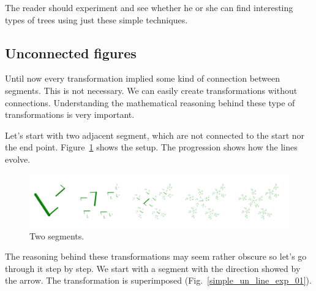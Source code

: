             \FloatBarrier

            The reader should experiment and see whether he or she can find interesting types of trees using just these simple techniques.

    \subsection{Unconnected figures}
        Until now every transformation implied some kind of connection between segments.
        This is not necessary.
        We can easily create transformations without connections.
        Understanding the mathematical reasoning behind these type of transformations is very important.
        
        Let's start with two adjacent segment, which are not connected to the start nor the end point.
        Figure~\ref{simple_un_line_01} shows the setup.
        The progression shows how the lines evolve.

        \begin{figure}[H]
            \caption{\label{simple_un_line_01} Two segments.}
            \centering
            \includegraphics[width=1.0\textwidth]{img/Simple_Techniques/Unconnect/simple_un_lines_01.png}         
        \end{figure}

        The reasoning behind these transformations may seem rather obscure so let's go through it step by step.
        We start with a segment with the direction showed by the arrow.
        The transformation is superimposed (Fig.~\ref{simple_un_line_exp_01}).

